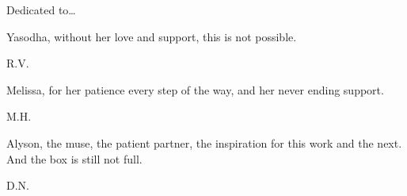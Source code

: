 \newpage



Dedicated to\dots \twomedskip


\begin{minipage}[t]{0.8\textwidth}
	\raggedright
		Yasodha, without her love and support, this is not possible. \par
  	\raggedleft
  	R.V.
\end{minipage} \vspace{1cm}


\begin{minipage}[t]{0.8\textwidth}
	\raggedright
		Melissa, for her patience every step of the way, and her never ending support. \par
  	\raggedleft
  	M.H.
\end{minipage} \vspace{1cm}


\begin{minipage}[t]{0.8\textwidth}
	\raggedright
		Alyson, the muse, the patient partner, the inspiration for this work and the next. And the box is still not full. \par
  	\raggedleft
  	D.N.
\end{minipage} 